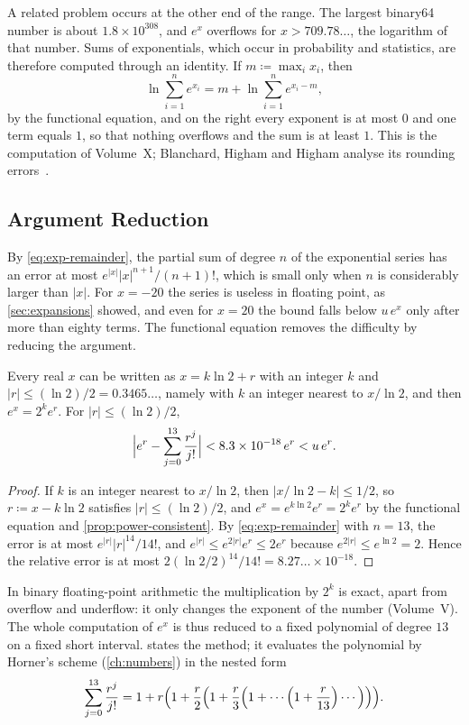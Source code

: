 A related problem occurs at the other end of the range. The largest binary64 number is about $1.8\times10^{308}$, and $e^x$ overflows for $x>709.78\ldots$, the logarithm of that number. Sums of exponentials, which occur in probability and statistics, are therefore computed through an identity. If $m\coloneqq\max_ix_i$, then
\[
\ln\sum_{i=1}^ne^{x_i}=m+\ln\sum_{i=1}^ne^{x_i-m},
\]
by the functional equation, and on the right every exponent is at most $0$ and one term equals $1$, so that nothing overflows and the sum is at least $1$. This is the  computation of Volume~X; Blanchard, Higham and Higham analyse its rounding errors~\cite{blanchard2021logsumexp}.

\subsection{Argument Reduction}

By \eqref{eq:exp-remainder}, the partial sum of degree $n$ of the exponential series has an error at most $e^{|x|}|x|^{n+1}/(n+1)!$, which is small only when $n$ is considerably larger than $|x|$. For $x=-20$ the series is useless in floating point, as \cref{sec:expansions} showed, and even for $x=20$ the bound falls below $u\,e^x$ only after more than eighty terms. The functional equation removes the difficulty by reducing the argument.

\begin{proposition}
\label{prop:exp-reduction}
Every real $x$ can be written as $x=k\ln2+r$ with an integer $k$ and $|r|\le(\ln2)/2=0.3465\ldots$, namely with $k$ an integer nearest to $x/\ln2$, and then $e^x=2^ke^r$. For $|r|\le(\ln2)/2$,
\[
\Bigl|e^r-\sum_{j=0}^{13}\frac{r^j}{j!}\Bigr|<8.3\times10^{-18}\,e^r<u\,e^r .
\]
\end{proposition}

\begin{proof}
If $k$ is an integer nearest to $x/\ln2$, then $|x/\ln2-k|\le1/2$, so $r\coloneqq x-k\ln2$ satisfies $|r|\le(\ln2)/2$, and $e^x=e^{k\ln2}e^r=2^ke^r$ by the functional equation and \cref{prop:power-consistent}. By \eqref{eq:exp-remainder} with $n=13$, the error is at most $e^{|r|}|r|^{14}/14!$, and $e^{|r|}\le e^{2|r|}e^r\le2e^r$ because $e^{2|r|}\le e^{\ln2}=2$. Hence the relative error is at most $2(\ln2/2)^{14}/14!=8.27\ldots\times10^{-18}$.
\end{proof}

In binary floating-point arithmetic the multiplication by $2^k$ is exact, apart from overflow and underflow: it only changes the exponent of the number (Volume~V). The whole computation of $e^x$ is thus reduced to a fixed polynomial of degree $13$ on a fixed short interval.  states the method; it evaluates the polynomial by Horner's scheme (\cref{ch:numbers}) in the nested form
\[
\sum_{j=0}^{13}\frac{r^j}{j!}=1+r\Bigl(1+\frac r2\Bigl(1+\frac r3\Bigl(1+\cdots\Bigl(1+\frac r{13}\Bigr)\cdots\Bigr)\Bigr)\Bigr).
\]


